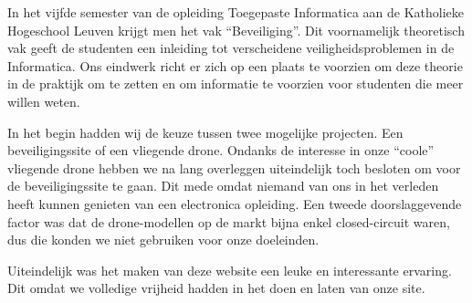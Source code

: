 In het vijfde semester van de opleiding Toegepaste Informatica aan de Katholieke Hogeschool Leuven krijgt men het vak ``Beveiliging''. Dit voornamelijk theoretisch vak geeft de studenten een inleiding tot verscheidene veiligheidsproblemen in de Informatica. Ons eindwerk richt er zich op een plaats te voorzien om deze theorie in de praktijk om te zetten en om informatie te voorzien voor studenten die meer willen weten.

In het begin hadden wij de keuze tussen twee mogelijke projecten. Een beveiligingssite of een vliegende drone. Ondanks de interesse in onze ``coole'' vliegende drone hebben we na lang overleggen uiteindelijk toch besloten om voor de beveiligingssite te gaan. Dit mede omdat niemand van ons in het verleden heeft kunnen genieten van een electronica opleiding. Een tweede doorslaggevende factor was dat de drone-modellen op de markt bijna enkel closed-circuit waren, dus die konden we niet gebruiken voor onze doeleinden.

Uiteindelijk was het maken van deze website een leuke en interessante ervaring. Dit omdat we volledige vrijheid hadden in het doen en laten van onze site.